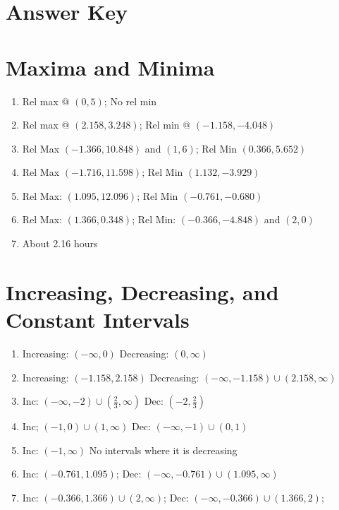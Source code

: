 \newpage

\section{Answer Key}

\section*{Maxima and Minima}

\begin{enumerate}
	\item Rel max @ $(0,5)$; No rel min
	\item Rel max @ $(2.158, 3.248)$; Rel min @ $(-1.158, -4.048)$
	\item Rel Max $(-1.366,10.848)$ and $(1,6)$; \quad Rel Min $(0.366,5.652)$
    \item Rel Max $(-1.716,11.598)$; \quad Rel Min $(1.132,-3.929)$
    \item Rel Max: $(1.095, 12.096)$; \quad Rel Min $(-0.761, -0.680)$
    \item Rel Max: $(1.366, 0.348)$; \quad
    Rel Min: $(-0.366, -4.848)$ and $(2,0)$
	\item About 2.16 hours
\end{enumerate}

\section*{Increasing, Decreasing, and Constant Intervals}

\begin{enumerate}
	\item Increasing: $(-\infty, 0)$ \quad Decreasing: $(0, \infty)$
	\item Increasing: $(-1.158, 2.158)$ \quad Decreasing: $(-\infty, -1.158) \cup (2.158, \infty)$
    \item Inc: $(-\infty,-2) \cup \left(\frac{2}{3},\infty\right)$ \quad Dec: $\left(-2, \frac{2}{3}\right)$
    \item Inc; $(-1,0) \cup (1, \infty)$ \quad Dec: $(-\infty, -1) \cup (0,1)$
    \item Inc: $(-1,\infty)$ \quad No intervals where it is decreasing
    \item Inc: $(-0.761, 1.095)$; \quad Dec: $(-\infty, -0.761) \cup (1.095, \infty)$
    \item Inc: $(-0.366,1.366) \cup (2, \infty)$; \quad
    Dec: $(-\infty, -0.366) \cup (1.366,2)$;
\end{enumerate}

